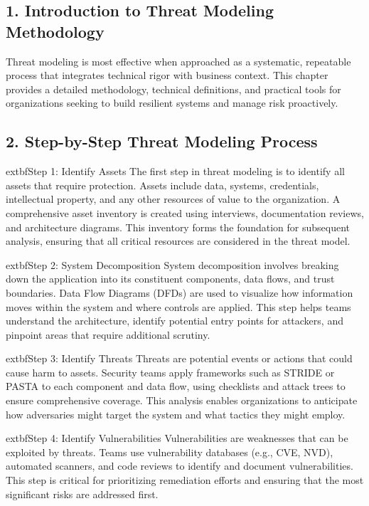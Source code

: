 

\subsection*{1. Introduction to Threat Modeling Methodology}
Threat modeling is most effective when approached as a systematic, repeatable process that integrates technical rigor with business context\cite{shostack2014,uceda2015,owasp}. This chapter provides a detailed methodology, technical definitions, and practical tools for organizations seeking to build resilient systems and manage risk proactively.

\subsection*{2. Step-by-Step Threat Modeling Process}
	extbf{Step 1: Identify Assets}
The first step in threat modeling is to identify all assets that require protection. Assets include data, systems, credentials, intellectual property, and any other resources of value to the organization\cite{nist800154}. A comprehensive asset inventory is created using interviews, documentation reviews, and architecture diagrams. This inventory forms the foundation for subsequent analysis, ensuring that all critical resources are considered in the threat model.

	extbf{Step 2: System Decomposition}
System decomposition involves breaking down the application into its constituent components, data flows, and trust boundaries\cite{shostack2014}. Data Flow Diagrams (DFDs) are used to visualize how information moves within the system and where controls are applied. This step helps teams understand the architecture, identify potential entry points for attackers, and pinpoint areas that require additional scrutiny.

	extbf{Step 3: Identify Threats}
Threats are potential events or actions that could cause harm to assets\cite{owasp}. Security teams apply frameworks such as STRIDE or PASTA to each component and data flow, using checklists and attack trees to ensure comprehensive coverage. This analysis enables organizations to anticipate how adversaries might target the system and what tactics they might employ.

	extbf{Step 4: Identify Vulnerabilities}
Vulnerabilities are weaknesses that can be exploited by threats\cite{nist800154}. Teams use vulnerability databases (e.g., CVE, NVD), automated scanners, and code reviews to identify and document vulnerabilities. This step is critical for prioritizing remediation efforts and ensuring that the most significant risks are addressed first.

